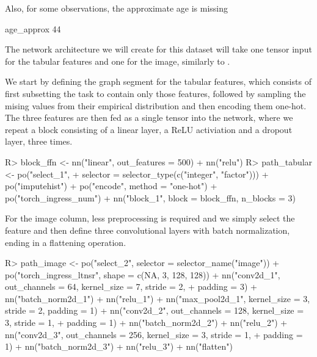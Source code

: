 \documentclass[article]{jss}
\theoremstyle{definition}
\begin{document}
Also, for some observations, the approximate age is missing

\begin{CodeOutput}
age_approx
        44
\end{CodeOutput}


The network architecture we will create for this dataset will take one tensor input for the tabular features and one for the image, similarly to .

We start by defining the graph segment for the tabular features, which consists of first subsetting the task to contain only those features, followed by sampling the mising values from their empirical distribution and then encoding them one-hot.
The three features are then fed as a single tensor into the network, where we repeat a block consisting of a linear layer, a ReLU activiation and a dropout layer, three times.

\begin{CodeInput}
R> block_ffn <- nn("linear", out_features = 500) %
+    nn("relu") %
R> path_tabular <- po("select_1",
+      selector = selector_type(c("integer", "factor"))) %
+    po("imputehist") %
+    po("encode", method = "one-hot") %
+    po("torch_ingress_num") %
+    nn("block_1", block = block_ffn, n_blocks = 3)
\end{CodeInput}

For the image column, less preprocessing is required and we simply select the feature and then define three convolutional layers with batch normalization, ending in a flattening operation.

\begin{CodeInput}
R> path_image <- po("select_2", selector = selector_name("image")) %
+    po("torch_ingress_ltnsr", shape = c(NA, 3, 128, 128)) %
+    nn("conv2d_1", out_channels = 64, kernel_size = 7, stride = 2,
+      padding = 3) %
+    nn("batch_norm2d_1") %
+    nn("relu_1") %
+    nn("max_pool2d_1", kernel_size = 3, stride = 2, padding = 1) %
+    nn("conv2d_2", out_channels = 128, kernel_size = 3, stride = 1,
+      padding = 1) %
+    nn("batch_norm2d_2") %
+    nn("relu_2") %
+    nn("conv2d_3", out_channels = 256, kernel_size = 3, stride = 1,
+      padding = 1) %
+    nn("batch_norm2d_3") %
+    nn("relu_3") %
+    nn("flatten")
\end{CodeInput}
\end{document}
